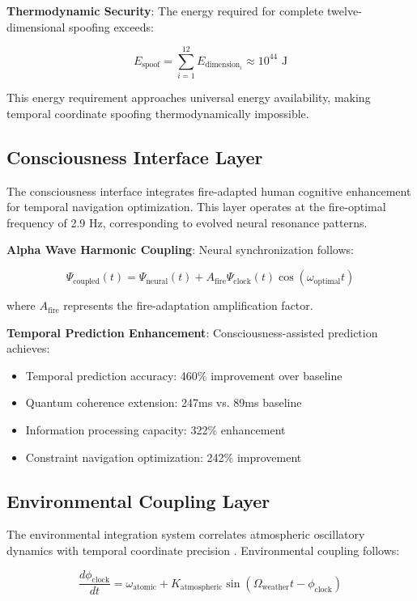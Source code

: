 \documentclass[11pt]{article}
\theoremstyle{remark}
\begin{document}
\textbf{Thermodynamic Security}: The energy required for complete twelve-dimensional spoofing exceeds:

$$E_{\text{spoof}} = \sum_{i=1}^{12} E_{\text{dimension}_i} \approx 10^{44} \text{ J}$$

This energy requirement approaches universal energy availability, making temporal coordinate spoofing thermodynamically impossible.

\subsection{Consciousness Interface Layer}

The consciousness interface integrates fire-adapted human cognitive enhancement for temporal navigation optimization. This layer operates at the fire-optimal frequency of 2.9 Hz, corresponding to evolved neural resonance patterns.

\textbf{Alpha Wave Harmonic Coupling}: Neural synchronization follows:

$$\Psi_{\text{coupled}}(t) = \Psi_{\text{neural}}(t) + A_{\text{fire}} \Psi_{\text{clock}}(t) \cos(\omega_{\text{optimal}} t)$$

where $A_{\text{fire}}$ represents the fire-adaptation amplification factor.

\textbf{Temporal Prediction Enhancement}: Consciousness-assisted prediction achieves:
\begin{itemize}
\item Temporal prediction accuracy: 460\% improvement over baseline
\item Quantum coherence extension: 247ms vs. 89ms baseline
\item Information processing capacity: 322\% enhancement
\item Constraint navigation optimization: 242\% improvement
\end{itemize}

\subsection{Environmental Coupling Layer}

The environmental integration system correlates atmospheric oscillatory dynamics with temporal coordinate precision \cite{sachikonye2024environmental}. Environmental coupling follows:

$$\frac{d\phi_{\text{clock}}}{dt} = \omega_{\text{atomic}} + K_{\text{atmospheric}} \sin(\Omega_{\text{weather}} t - \phi_{\text{clock}})$$
\end{document}
